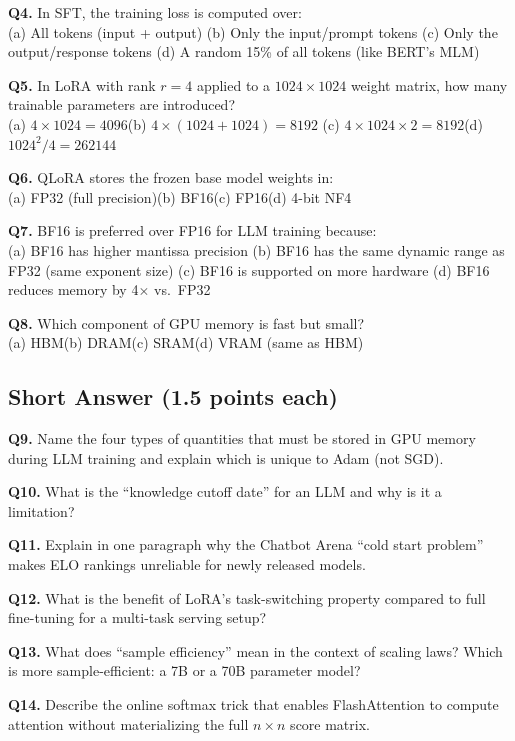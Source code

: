 \documentclass[11pt, a4paper]{article}
\begin{document}
\textbf{Q4.} In SFT, the training loss is computed over:\\
(a) All tokens (input + output)\quad
(b) Only the input/prompt tokens\quad
(c) Only the output/response tokens\quad
(d) A random 15\% of all tokens (like BERT's MLM)

\textbf{Q5.} In LoRA with rank $r=4$ applied to a $1024 \times 1024$ weight matrix, how many trainable parameters are introduced?\\
(a) $4 \times 1024 = 4096$\quad (b) $4 \times (1024 + 1024) = 8192$\quad
(c) $4 \times 1024 \times 2 = 8192$\quad (d) $1024^2 / 4 = 262144$

\textbf{Q6.} QLoRA stores the frozen base model weights in:\\
(a) FP32 (full precision)\quad (b) BF16\quad (c) FP16\quad (d) 4-bit NF4

\textbf{Q7.} BF16 is preferred over FP16 for LLM training because:\\
(a) BF16 has higher mantissa precision\quad
(b) BF16 has the same dynamic range as FP32 (same exponent size)\quad
(c) BF16 is supported on more hardware\quad
(d) BF16 reduces memory by 4$\times$ vs.\ FP32

\textbf{Q8.} Which component of GPU memory is fast but small?\\
(a) HBM\quad (b) DRAM\quad (c) SRAM\quad (d) VRAM (same as HBM)

\subsection*{Short Answer (1.5 points each)}

\textbf{Q9.} Name the four types of quantities that must be stored in GPU memory during LLM training and explain which is unique to Adam (not SGD).

\textbf{Q10.} What is the ``knowledge cutoff date'' for an LLM and why is it a limitation?

\textbf{Q11.} Explain in one paragraph why the Chatbot Arena ``cold start problem'' makes ELO rankings unreliable for newly released models.

\textbf{Q12.} What is the benefit of LoRA's task-switching property compared to full fine-tuning for a multi-task serving setup?

\textbf{Q13.} What does ``sample efficiency'' mean in the context of scaling laws? Which is more sample-efficient: a 7B or a 70B parameter model?

\textbf{Q14.} Describe the online softmax trick that enables FlashAttention to compute attention without materializing the full $n \times n$ score matrix.
\end{document}
